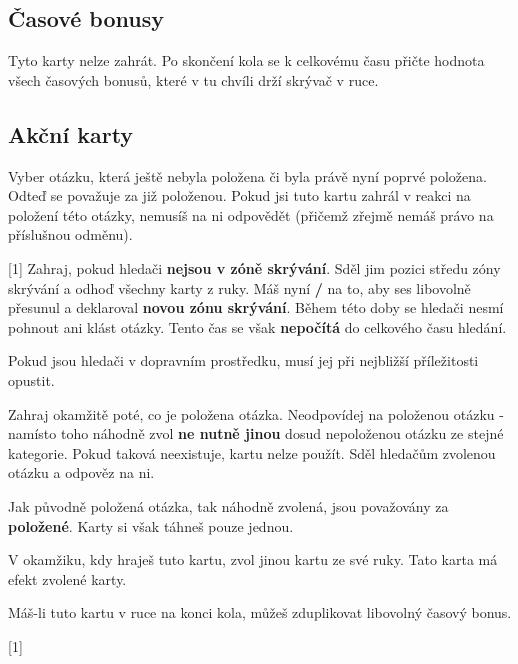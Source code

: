 

\subsection{Časové bonusy}

Tyto karty nelze zahrát. Po skončení kola se k celkovému času přičte hodnota všech časových bonusů, které v tu chvíli drží skrývač v ruce.

\begin{cards}
\end{cards}

\subsection{Akční karty}

\begin{cards}
	 Vyber otázku, která ještě nebyla položena či byla právě nyní poprvé položena. Odteď se považuje za již položenou. Pokud jsi tuto kartu zahrál v reakci na položení této otázky, nemusíš na ni odpovědět (přičemž zřejmě nemáš právo na příslušnou odměnu).
	
	 Zahraj, pokud hledači \textbf{nejsou v zóně skrývání}. Sděl jim pozici středu zóny skrývání a odhoď všechny karty z ruky. Máš nyní \textbf{\timehidingmove/} na to, aby ses libovolně přesunul a deklaroval \textbf{novou zónu skrývání}. Během této doby se hledači nesmí pohnout ani klást otázky. Tento čas se však \textbf{nepočítá} do celkového času hledání.

	Pokud jsou hledači v dopravním prostředku, musí jej při nejbližší příležitosti opustit.
	
	
	
	 Zahraj okamžitě poté, co je položena otázka. Neodpovídej na položenou otázku - namísto toho náhodně zvol \textbf{ne nutně jinou} dosud nepoloženou otázku ze stejné kategorie. Pokud taková neexistuje, kartu nelze použít. Sděl hledačům zvolenou otázku a odpověz na ni.
	
	Jak původně položená otázka, tak náhodně zvolená, jsou považovány za \textbf{položené}. Karty si však táhneš pouze jednou.
	
	 V okamžiku, kdy hraješ tuto kartu, zvol jinou kartu ze své ruky. Tato karta má efekt zvolené karty.
	
	Máš-li tuto kartu v ruce na konci kola, můžeš zduplikovat libovolný časový bonus.
	
\end{cards}

